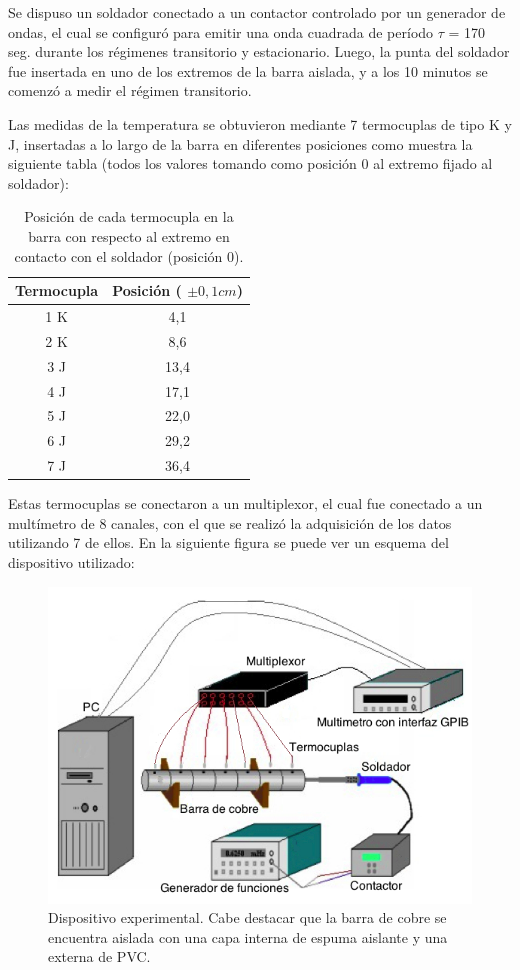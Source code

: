 \documentclass[twoside,twocolumn,a4paper]{article}
\begin{document}
Se dispuso un soldador conectado a un contactor controlado por un generador de ondas, el cual se configur\'o para emitir una onda cuadrada de per\'iodo $\tau$ = 170 seg. durante los r\'egimenes transitorio y estacionario. Luego, la punta del soldador fue insertada en uno de los extremos de la barra aislada, y a los 10 minutos se comenz\'o a medir el r\'egimen transitorio. \newline

\par
Las medidas de la temperatura se obtuvieron mediante 7 termocuplas de tipo K y J, insertadas a lo largo de la barra en diferentes posiciones como muestra la siguiente tabla (todos los valores tomando como posici\'on 0 al extremo fijado al soldador):

\begin{table}[H]
\centering
\caption{Posici\'on de cada termocupla en la barra con respecto al extremo en contacto con el soldador (posici\'on 0).}
\label{tab:posiciones}
\begin{tabular}{|c|c|}
\hline
Termocupla & Posici\'on ( $\pm 0,1 cm$) \\ \hline
1 K & 4,1\\ \hline
2 K & 8,6\\ \hline
3 J & 13,4\\ \hline
4 J & 17,1\\ \hline
5 J & 22,0\\ \hline
6 J & 29,2\\ \hline
7 J & 36,4\\ \hline
\end{tabular}
\end{table}


Estas termocuplas se conectaron a un multiplexor, el cual fue conectado a un mult\'imetro de 8 canales, con el que se realiz\'o la adquisici\'on de los datos utilizando 7 de ellos. En la siguiente figura se puede ver un esquema del dispositivo utilizado:

\begin{figure}[H]
\includegraphics[width=\linewidth]{dispexp.jpg}
\caption{Dispositivo experimental. Cabe destacar que la barra de cobre se encuentra aislada con una capa interna de espuma aislante y una externa de PVC.}
\label{fig:disenoestatico}
\end{figure}
\end{document}
